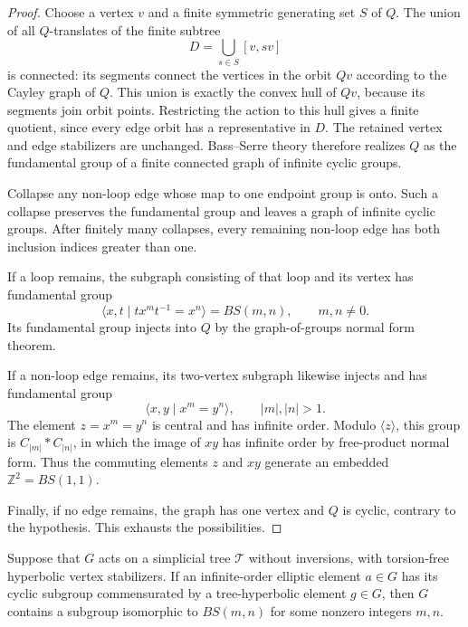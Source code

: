 \begin{proof}
Choose a vertex \(v\) and a finite symmetric generating set \(S\) of \(Q\).
The union of all \(Q\)-translates of the finite subtree
\[
  D=\bigcup_{s\in S}[v,sv]
\]
is connected: its segments connect the vertices in the orbit \(Qv\)
according to the Cayley graph of \(Q\). This union is exactly the convex
hull of \(Qv\), because its segments join orbit points. Restricting the
action to this hull gives a finite quotient, since every edge orbit has
a representative in \(D\). The retained vertex and edge stabilizers are
unchanged. Bass--Serre theory therefore realizes \(Q\) as the fundamental
group of a finite connected graph of infinite cyclic groups.

Collapse any non-loop edge whose map to one endpoint group is onto.
Such a collapse preserves the fundamental group and leaves a graph of
infinite cyclic groups. After finitely many collapses, every remaining
non-loop edge has both inclusion indices greater than one.

If a loop remains, the subgraph consisting of that loop and its vertex
has fundamental group
\[
  \langle x,t\mid t x^m t^{-1}=x^n\rangle=BS(m,n),
  \qquad m,n\neq 0.
\]
Its fundamental group injects into \(Q\) by the graph-of-groups normal
form theorem.

If a non-loop edge remains, its two-vertex subgraph likewise injects and
has fundamental group
\[
  \langle x,y\mid x^m=y^n\rangle,
  \qquad |m|,|n|>1.
\]
The element \(z=x^m=y^n\) is central and has infinite order. Modulo
\(\langle z\rangle\), this group is \(C_{|m|}*C_{|n|}\), in which the image
of \(xy\) has infinite order by free-product normal form. Thus the
commuting elements \(z\) and \(xy\) generate an embedded
\(\mathbb Z^2=BS(1,1)\).

Finally, if no edge remains, the graph has one vertex and \(Q\) is
cyclic, contrary to the hypothesis. This exhausts the possibilities.
\end{proof}

\begin{lemma}
\label{pre:elliptic-commensurator}
Suppose that \(G\) acts on a simplicial tree \(\mathcal T\) without
inversions, with torsion-free hyperbolic vertex stabilizers. If an
infinite-order elliptic element \(a\in G\) has its cyclic subgroup
commensurated by a tree-hyperbolic element \(g\in G\), then \(G\) contains
a subgroup isomorphic to \(BS(m,n)\) for some nonzero integers \(m,n\).
\end{lemma}

